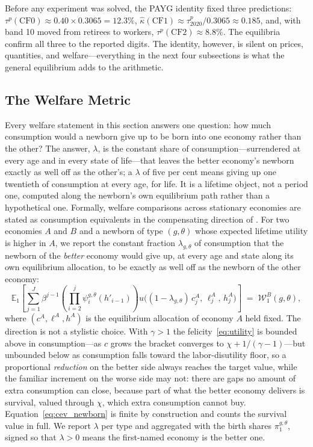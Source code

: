 \documentclass[12pt,a4paper]{article}
\newcommand{\E}{\mathbb{E}}
\begin{document}
Before any experiment was solved, the PAYG identity fixed three predictions: $\tau^p(\mathrm{CF0}) \approx 0.40 \times 0.3065 = 12.3\%$, $\widehat\kappa(\mathrm{CF1}) \approx \tau^p_{2020}/0.3065 \approx 0.185$, and, with band 10 moved from retirees to workers, $\tau^p(\mathrm{CF2}) \approx 8.8\%$. The equilibria confirm all three to the reported digits. The identity, however, is silent on prices, quantities, and welfare---everything in the next four subsections is what the general equilibrium adds to the arithmetic.

\subsection{The Welfare Metric}
\label{subsec:welfare_incidence}

Every welfare statement in this section answers one question: how much consumption would a newborn give up to be born into one economy rather than the other? The answer, $\lambda$, is the constant share of consumption---surrendered at every age and in every state of life---that leaves the better economy's newborn exactly as well off as the other's; a $\lambda$ of five per cent means giving up one twentieth of consumption at every age, for life. It is a lifetime object, not a period one, computed along the newborn's own equilibrium path rather than a hypothetical one. Formally, welfare comparisons across stationary economies are stated as consumption equivalents in the compensating direction of \citet{DeNardiPashchenkoPorapakkarm2017}. For two economies $A$ and $B$ and a newborn of type $(g,\theta)$ whose expected lifetime utility is higher in $A$, we report the constant fraction $\lambda_{g,\theta}$ of consumption that the newborn of the \emph{better} economy would give up, at every age and state along its own equilibrium allocation, to be exactly as well off as the newborn of the other economy:
\begin{equation}
\label{eq:cev_newborn}
\E_1\!\left[\sum_{j=1}^{J} \beta^{j-1}\!\left(\prod_{i=2}^{j}\psi_{i}^{g,\theta}(h'_{i-1})\right) u\bigl((1-\lambda_{g,\theta})\,c_j^{A},\,\ell_j^{A},\,h_j^{A}\bigr)\right] \;=\; \mathcal{W}_1^{B}(g,\theta),
\end{equation}
where $(c^A,\ell^A,h^A)$ is the equilibrium allocation of economy $A$ held fixed. The direction is not a stylistic choice. With $\gamma>1$ the felicity~\eqref{eq:utility} is bounded above in consumption---as $c$ grows the bracket converges to $\chi + 1/(\gamma-1)$---but unbounded below as consumption falls toward the labor-disutility floor, so a proportional \emph{reduction} on the better side always reaches the target value, while the familiar increment on the worse side may not: there are gaps no amount of extra consumption can close, because part of what the better economy delivers is survival, valued through $\chi$, which extra consumption cannot buy. Equation~\eqref{eq:cev_newborn} is finite by construction and counts the survival value in full. We report $\lambda$ per type and aggregated with the birth shares $\pi^{g,\theta}_1$, signed so that $\lambda>0$ means the first-named economy is the better one.
\end{document}
